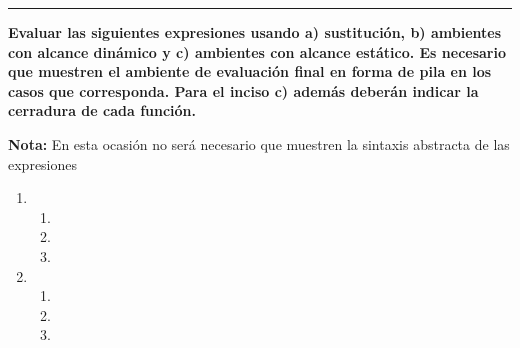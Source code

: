 \documentclass[11pt,letterpaper]{article}
\begin{document}

\rule{17cm}{0.1mm}


\begin{center}
    \textbf{Evaluar las siguientes expresiones usando a) sustitución, b) ambientes con alcance dinámico y c) ambientes con alcance estático. Es necesario que muestren el ambiente de evaluación final en forma de pila en los casos que corresponda. Para el inciso c) además deberán indicar la cerradura de cada función.}\vspace{.2cm}
    
    \textbf{Nota: }En esta ocasión no será necesario que muestren la sintaxis abstracta de las expresiones
\end{center}
\begin{enumerate}
    \item 
    \begin{enumerate}
        \item 
        \item 
        \item 
    \end{enumerate}
    \item 
    \begin{enumerate}
        \item 
        \item 
        \item 
    \end{enumerate}
\end{enumerate}
\end{document}
